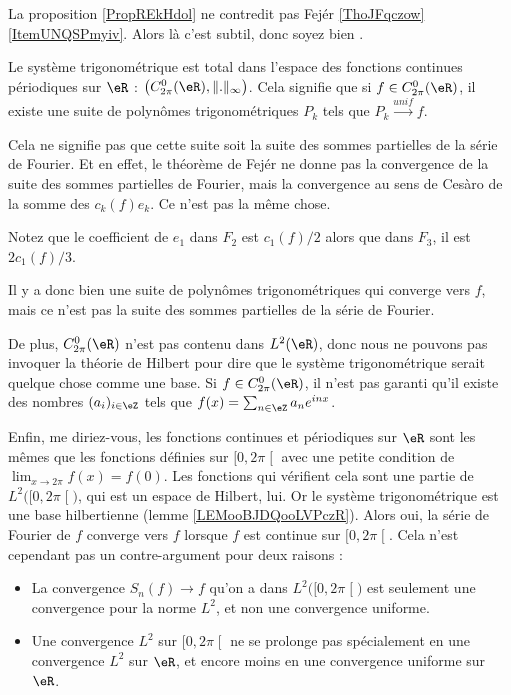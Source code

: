 \begin{normaltext}      \label{NORMooGKKWooFmOBeE}
	La proposition \ref{PropREkHdol} ne contredit pas Fejér \ref{ThoJFqczow}\ref{ItemUNQSPmyiv}. Alors là c'est subtil, donc soyez bien .

	Le système trigonométrique est total dans l'espace des fonctions continues périodiques sur \( \eR\) : \( \big(  C^0_{2\pi}(\eR),\| . \|_{\infty}\big)\). Cela signifie que si \( f\in C^0_{2\pi}(\eR)\), il  existe une suite de polynômes trigonométriques \( P_k\) tels que \( P_k\stackrel{unif}{\longrightarrow}f\).

	Cela ne signifie pas que cette suite soit la suite des sommes partielles de la série de Fourier. Et en effet, le théorème de Fejér ne donne pas la convergence de la suite des sommes partielles de Fourier, mais la convergence au sens de Cesàro de la somme des \( c_k(f)e_k\). Ce n'est pas la même chose.

	Notez que le coefficient de \( e_1\) dans \( F_2\) est \( c_1(f)/2\) alors que dans \( F_3\), il est \( 2c_1(f)/3\).

	Il y a donc bien une suite de polynômes trigonométriques qui converge vers \( f\), mais ce n'est pas la suite des sommes partielles de la série de Fourier.

	De plus, \( C^0_{2\pi}(\eR)\) n'est pas contenu dans \( L^2(\eR)\), donc nous ne pouvons pas invoquer la théorie de Hilbert pour dire que le système trigonométrique serait quelque chose comme une base. Si \( f\in C^0_{2\pi}(\eR)\), il n'est pas garanti qu'il existe des nombres \( (a_i)_{i\in \eZ}\) tels que \( f(x)=\sum_{n\in \eZ}a_n e^{inx}\).

	Enfin, me diriez-vous, les fonctions continues et périodiques sur \( \eR\) sont les mêmes que les fonctions définies sur \( \mathopen[ 0 , 2\pi \mathclose[\) avec une petite condition de \( \lim_{x\to 2\pi} f(x)=f(0)\). Les fonctions qui vérifient cela sont une partie de \( L^2\big( \mathopen[ 0 , 2\pi \mathclose[ \big)\), qui est un espace de Hilbert, lui. Or le système trigonométrique est une base hilbertienne (lemme \ref{LEMooBJDQooLVPczR}). Alors oui, la série de Fourier de \( f\) converge vers \( f\) lorsque \( f\) est continue sur \( \mathopen[ 0 , 2\pi \mathclose[\). Cela n'est cependant pas un contre-argument pour deux raisons :
	\begin{itemize}
		\item
		      La convergence \( S_n(f)\to f\) qu'on a dans \( L^2\big( \mathopen[ 0 , 2\pi \mathclose[ \big)\) est seulement une convergence pour la norme \( L^2\), et non une convergence uniforme.
		\item
		      Une convergence \( L^2\) sur \( \mathopen[ 0 , 2\pi \mathclose[\) ne se prolonge pas spécialement en une convergence \( L^2\) sur \( \eR\), et encore moins en une convergence uniforme sur \( \eR\).
	\end{itemize}
\end{normaltext}

